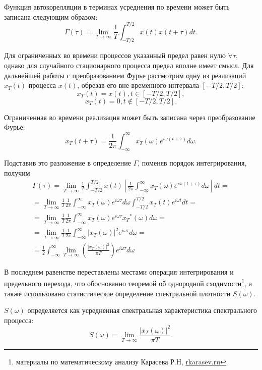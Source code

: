 \documentclass{urticle}
\begin{document}
Функция автокорелляции в терминах усреднения по времени может быть записана следующим образом:
	$$\Gamma(\tau) = \lim\limits_{T\rightarrow\infty} \frac{1}{T} \int_{-T/2}^{T/2} x(t)x(t+\tau)dt.$$

Для ограниченных во времени процессов указанный предел равен нулю $\forall \tau$, однако для случайного стационарного процесса предел вполне имеет смысл. Для дальнейшей работы с преобразованием Фурье рассмотрим одну из реализаций $x_T(t)$ процесса $x(t)$, обрезав его вне временного интервала $[-T/2, T/2]$:
$$x_T(t) = x(t), t \in [-T/2, T/2],$$
$$x_T(t) = 0 ,  t \notin [-T/2, T/2].$$

Ограниченная во времени реализация может быть записана через преобразование Фурье:
$$x_T(t+\tau) = \frac{1}{2\pi}\int_{-\infty}^{\infty}x_T(\omega)e^{i\omega(t+\tau)}d\omega.$$

Подставив это разложение в определение $\Gamma$, поменяв порядок интегрирования, получим
\begin{multline*}
	\Gamma(\tau) = \lim\limits_{T\rightarrow\infty} \frac{1}{T} \int_{-T/2}^{T/2} x(t) \left[ \frac{1}{2\pi}\int_{-\infty}^{\infty}x_T(\omega)e^{i\omega(t+\tau)}d\omega \right ] dt =\\
	=\lim\limits_{T\rightarrow\infty} \frac{1}{T} \frac{1}{2\pi}\int_{-\infty}^{\infty}x_T(\omega)e^{i\omega\tau}d\omega \int_{-T/2}^{T/2} x_T(t) e^{i \omega t} dt =\\
	=\lim\limits_{T\rightarrow\infty} \frac{1}{T} \frac{1}{2\pi}\int_{-\infty}^{\infty}x_T(\omega)e^{i\omega\tau} {x_T}^*(\omega) d\omega =\\
	=\lim\limits_{T\rightarrow\infty} \frac{1}{T} \frac{1}{2\pi}\int_{-\infty}^{\infty}|x_T(\omega)|^2 e^{i\omega\tau} d\omega =\\
	=\frac{1}{2} \int_{-\infty}^{\infty} \lim\limits_{T\rightarrow\infty} \left( \frac{|x_T(\omega)|^2}{\pi T} \right) e^{i\omega\tau} d\omega
\end{multline*}

В последнем равенстве переставлены местами операция интегрирования и предельного перехода, что обоснованно теоремой об однородной сходимости\footnote{материалы по математическому анализу Карасева Р.Н, \href{http://www.rkarasev.ru}{rkarasev.ru}}, а также использовано статистическое определение спектральной плотности $S(\omega)$.

$S(\omega)$ определяется как усредненная спектральная характеристика спектрального процесса:
$$S(\omega) = \lim\limits_{T\rightarrow\infty} \frac{|x_T(\omega)|^2}{\pi T}.$$
\end{document}
